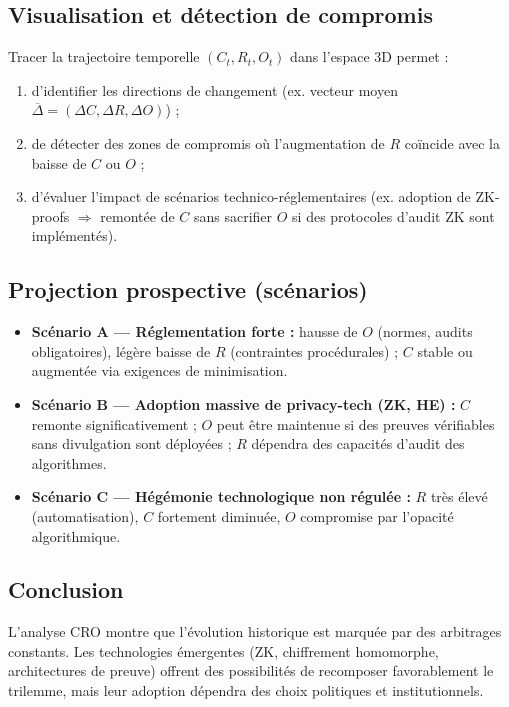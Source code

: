 \documentclass[memoire, 12pt]{report}
\begin{document}
\subsection*{Visualisation et détection de compromis}
Tracer la trajectoire temporelle $(C_t,R_t,O_t)$ dans l'espace 3D permet :
\begin{enumerate}
  \item d'identifier les directions de changement (ex. vecteur moyen $\overline{\Delta}=(\Delta C,\Delta R,\Delta O)$) ;
  \item de détecter des zones de compromis où l'augmentation de $R$ coïncide avec la baisse de $C$ ou $O$ ;
  \item d'évaluer l'impact de scénarios technico-réglementaires (ex. adoption de ZK-proofs $\Rightarrow$ remontée de $C$ sans sacrifier $O$ si des protocoles d'audit ZK sont implémentés).
\end{enumerate}

\subsection*{Projection prospective (scénarios)}
\begin{itemize}
  \item \textbf{Scénario A — Réglementation forte :} hausse de $O$ (normes, audits obligatoires), légère baisse de $R$ (contraintes procédurales) ; $C$ stable ou augmentée via exigences de minimisation.
  \item \textbf{Scénario B — Adoption massive de privacy-tech (ZK, HE) :} $C$ remonte significativement ; $O$ peut être maintenue si des preuves vérifiables sans divulgation sont déployées ; $R$ dépendra des capacités d'audit des algorithmes.
  \item \textbf{Scénario C — Hégémonie technologique non régulée :} $R$ très élevé (automatisation), $C$ fortement diminuée, $O$ compromise par l'opacité algorithmique.
\end{itemize}

\subsection*{Conclusion}
L'analyse CRO montre que l'évolution historique est marquée par des arbitrages constants. Les technologies émergentes (ZK, chiffrement homomorphe, architectures de preuve) offrent des possibilités de recomposer favorablement le trilemme, mais leur adoption dépendra des choix politiques et institutionnels.
\end{document}

